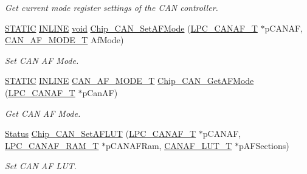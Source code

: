 \begin{DoxyCompactItemize}
\begin{DoxyCompactList}\small\item\em Get current mode register settings of the C\-A\-N controller. \end{DoxyCompactList}\item 
\hyperlink{group__LPC__Types__Public__Macros_ga10b2d890d871e1489bb02b7e70d9bdfb}{S\-T\-A\-T\-I\-C} \hyperlink{group__LPC__Types__Public__Types_ga2eb6f9e0395b47b8d5e3eeae4fe0c116}{I\-N\-L\-I\-N\-E} \hyperlink{Paradigm_2Tern__EE_2small_2portmacro_8h_a14d32f8130d3c0b212cfc751730b5b49}{void} \hyperlink{group__CAN__17XX__40XX_gaea7126f0eb3c4195137d5158415410a2}{Chip\-\_\-\-C\-A\-N\-\_\-\-Set\-A\-F\-Mode} (\hyperlink{structLPC__CANAF__T}{L\-P\-C\-\_\-\-C\-A\-N\-A\-F\-\_\-\-T} $\ast$p\-C\-A\-N\-A\-F, \hyperlink{group__CAN__17XX__40XX_gaf9abd01ef9ba38a2113a240871e9b48a}{C\-A\-N\-\_\-\-A\-F\-\_\-\-M\-O\-D\-E\-\_\-\-T} Af\-Mode)
\begin{DoxyCompactList}\small\item\em Set C\-A\-N A\-F Mode. \end{DoxyCompactList}\item 
\hyperlink{group__LPC__Types__Public__Macros_ga10b2d890d871e1489bb02b7e70d9bdfb}{S\-T\-A\-T\-I\-C} \hyperlink{group__LPC__Types__Public__Types_ga2eb6f9e0395b47b8d5e3eeae4fe0c116}{I\-N\-L\-I\-N\-E} \hyperlink{group__CAN__17XX__40XX_gaf9abd01ef9ba38a2113a240871e9b48a}{C\-A\-N\-\_\-\-A\-F\-\_\-\-M\-O\-D\-E\-\_\-\-T} \hyperlink{group__CAN__17XX__40XX_ga7f33c4f2edcfc126ad4d55ac86b2ad23}{Chip\-\_\-\-C\-A\-N\-\_\-\-Get\-A\-F\-Mode} (\hyperlink{structLPC__CANAF__T}{L\-P\-C\-\_\-\-C\-A\-N\-A\-F\-\_\-\-T} $\ast$p\-Can\-A\-F)
\begin{DoxyCompactList}\small\item\em Get C\-A\-N A\-F Mode. \end{DoxyCompactList}\item 
\hyperlink{group__LPC__Types__Public__Types_ga67a0db04d321a74b7e7fcfd3f1a3f70b}{Status} \hyperlink{group__CAN__17XX__40XX_gaa58803ce4de8c8520925ebd1cbfd2019}{Chip\-\_\-\-C\-A\-N\-\_\-\-Set\-A\-F\-L\-U\-T} (\hyperlink{structLPC__CANAF__T}{L\-P\-C\-\_\-\-C\-A\-N\-A\-F\-\_\-\-T} $\ast$p\-C\-A\-N\-A\-F, \hyperlink{structLPC__CANAF__RAM__T}{L\-P\-C\-\_\-\-C\-A\-N\-A\-F\-\_\-\-R\-A\-M\-\_\-\-T} $\ast$p\-C\-A\-N\-A\-F\-Ram, \hyperlink{structCANAF__LUT__T}{C\-A\-N\-A\-F\-\_\-\-L\-U\-T\-\_\-\-T} $\ast$p\-A\-F\-Sections)
\begin{DoxyCompactList}\small\item\em Set C\-A\-N A\-F L\-U\-T. \end{DoxyCompactList}\item 

\end{DoxyCompactItemize}
